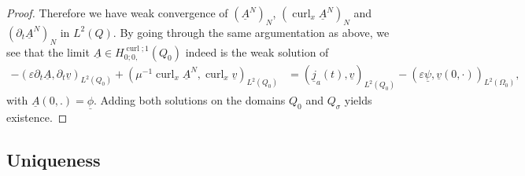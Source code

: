 \documentclass[a4paper,11pt]{article}
\newcommand{\cu}{\operatorname{curl}}
\renewcommand{\vec}[1]{\underline{#1}}
\begin{document}
\begin{proof}
		Therefore we have weak convergence of $(\vec A^N)_N$, $(\cu_x \vec A^N)_N$ and $(\partial_t \vec A^N)_N$ in $L^2(Q)$. By going through the same argumentation as above, we see that the limit $\vec A\in H^{\cu;1}_{0;0,}(Q_0)$ indeed is the weak solution of
		\begin{align*}
			-(\varepsilon\partial_{t}\vec A ,\partial_{t}\vec  v)_{L^2(Q_0)}  +(\mu^{-1}\cu_x  \vec A^N ,\cu_x \vec v)_{L^2(Q_0)}	&=(\vec j_a(t),\vec v)_{L^2(Q_0)}- \left(\varepsilon\vec \psi, \vec v(0,\cdot)\right)_{L^2(\Omega_0)},
		\end{align*}
		with  $\vec A(0,.)=\vec \phi$. Adding both solutions on the domains $Q_0$ and $Q_\sigma$ yields existence. 
	
\end{proof}


\subsection{Uniqueness}
\end{document}
